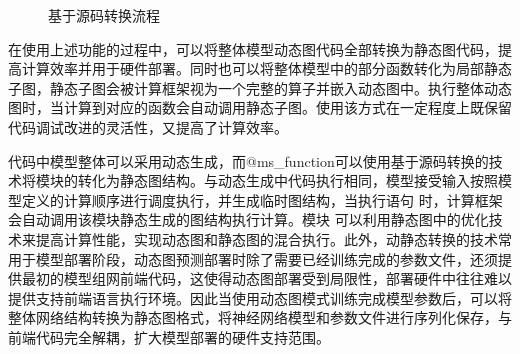 \documentclass[letterpaper,10pt,english]{sphinxmanual}
\let\sphinxpxdimen\pdfpxdimen\else\newdimen\sphinxpxdimen
\begin{document}
\begin{figure}[H]
\centering
\capstart

\noindent\sphinxincludegraphics[width=800\sphinxpxdimen]{{ast}.svg}
\caption{基于源码转换流程}\label{\detokenize{chapter_computational_graph/generation_of_computational_graph:id11}}\label{\detokenize{chapter_computational_graph/generation_of_computational_graph:ast}}\end{figure}

\sphinxAtStartPar
在使用上述功能的过程中，可以将整体模型动态图代码全部转换为静态图代码，提高计算效率并用于硬件部署。同时也可以将整体模型中的部分函数转化为局部静态子图，静态子图会被计算框架视为一个完整的算子并嵌入动态图中。执行整体动态图时，当计算到对应的函数会自动调用静态子图。使用该方式在一定程度上既保留代码调试改进的灵活性，又提高了计算效率。

\begin{sphinxVerbatim}[commandchars=\\\{\}]
 
  
        
      
     

  
     
           
           
           
     
\end{sphinxVerbatim}

\sphinxAtStartPar
代码中模型整体可以采用动态生成，而@ms\_function可以使用基于源码转换的技术将模块的转化为静态图结构。与动态生成中代码执行相同，模型接受输入按照模型定义的计算顺序进行调度执行，并生成临时图结构，当执行语句
时，计算框架会自动调用该模块静态生成的图结构执行计算。模块
可以利用静态图中的优化技术来提高计算性能，实现动态图和静态图的混合执行。此外，动静态转换的技术常用于模型部署阶段，动态图预测部署时除了需要已经训练完成的参数文件，还须提供最初的模型组网前端代码，这使得动态图部署受到局限性，部署硬件中往往难以提供支持前端语言执行环境。因此当使用动态图模式训练完成模型参数后，可以将整体网络结构转换为静态图格式，将神经网络模型和参数文件进行序列化保存，与前端代码完全解耦，扩大模型部署的硬件支持范围。
\end{document}
